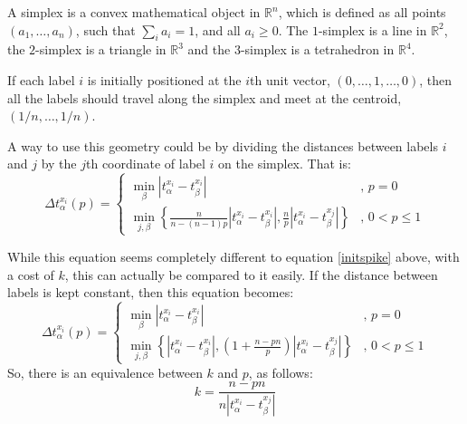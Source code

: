 A simplex is a convex mathematical object in $\mathbb{R}^n$, which is defined as all points $(a_1,\dots,a_n)$, such that $\sum_i a_i = 1$, and all $a_i\geq0$.  The $1$-simplex is a line in $\mathbb{R}^2$, the $2$-simplex is a triangle in $\mathbb{R}^3$ and the $3$-simplex is a tetrahedron in $\mathbb{R}^4$.

If each label $i$ is initially positioned at the $i$th unit vector, $(0,\ldots,1,\dots,0)$, then all the labels should travel along the simplex and meet at the centroid, $(1/n,\ldots,1/n)$.

A way to use this geometry could be by dividing the distances between labels $i$ and $j$ by the $j$th coordinate of label $i$ on the simplex.  That is:
\begin{equation}\label{multspike}
\Delta t_{\alpha}^{x_i}(p) = \left\{ \begin{array}{ll} \min_{\beta} | t_{\alpha}^{x_i} - t_{\beta}^{x_i} | & , \, p=0 \\
\min_{j,\beta}\left\{ \frac{n}{n-(n-1)p} | t_{\alpha}^{x_i} - t_{\beta}^{x_i} |,\frac{n}{p} | t_{\alpha}^{x_i} - t_{\beta}^{x_j} |\right\} & , \, 0<p\leq1 \end{array}\right.
\end{equation}

While this equation seems completely different to equation \ref{initspike} above, with a cost of $k$, this can actually be compared to it easily.  If the distance between labels is kept constant, then this equation becomes:
\begin{equation}
\Delta t_{\alpha}^{x_i}(p) = \left\{ \begin{array}{ll} \min_{\beta} | t_{\alpha}^{x_i} - t_{\beta}^{x_i} | & , \, p=0 \\
\min_{j,\beta}\left\{  | t_{\alpha}^{x_i} - t_{\beta}^{x_i} |,\left(1+\frac{n-pn}{p} \right) | t_{\alpha}^{x_i} - t_{\beta}^{x_j} |\right\} & , \, 0<p\leq1 \end{array}\right.
\end{equation}
So, there is an equivalence between $k$ and $p$, as follows:
\begin{equation}
k = \frac{n-pn}{n | t_{\alpha}^{x_i} - t_{\beta}^{x_j} |}
\end{equation}
%
%

